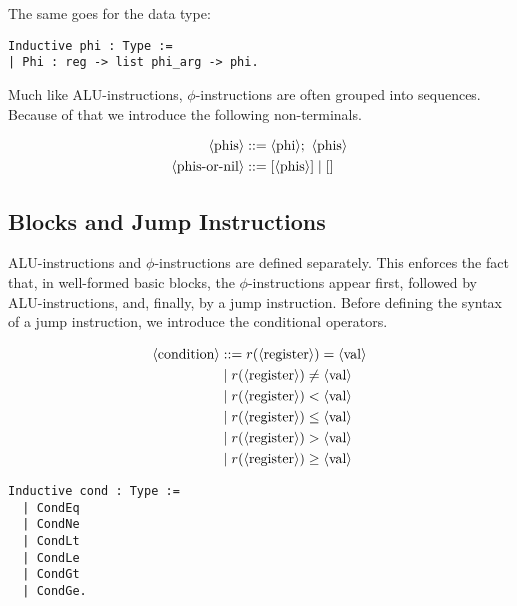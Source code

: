The same goes for the data type:

\begin{lstlisting}[style=Rocq]
Inductive phi : Type :=
| Phi : reg -> list phi_arg -> phi.
\end{lstlisting}

Much like ALU-instructions, $\phi$-instructions are often grouped into sequences. Because of that we introduce the following non-terminals.

\begin{align*}
\langle\text{phis}\rangle &::= \langle\text{phi}\rangle ; \ \langle\text{phis}\rangle \\
\langle\text{phis-or-nil}\rangle &::= [ \langle\text{phis}\rangle ] \mid []
\end{align*}


\subsection{Blocks and Jump Instructions}

ALU-instructions and $\phi$-instructions are defined separately. This enforces the fact that, in well-formed basic blocks, the $\phi$-instructions appear first, followed by ALU-instructions, and, finally, by a jump instruction.
Before defining the syntax of a jump instruction, we introduce the conditional operators.

\begin{minipage}{0.45\linewidth}
\begin{align*}
\langle\text{condition}\rangle &::= r(\langle\text{register}\rangle) = \langle\text{val}\rangle \\
&\mid r(\langle\text{register}\rangle) \neq \langle\text{val}\rangle \\
&\mid r(\langle\text{register}\rangle) < \langle\text{val}\rangle \\
&\mid r(\langle\text{register}\rangle) \leq \langle\text{val}\rangle \\
&\mid r(\langle\text{register}\rangle) > \langle\text{val}\rangle \\
&\mid r(\langle\text{register}\rangle) \geq \langle\text{val}\rangle \\
\end{align*}
\end{minipage}
\hfill
\begin{minipage}{0.45\linewidth}
\begin{lstlisting}[style=Rocq]
Inductive cond : Type :=
  | CondEq
  | CondNe
  | CondLt
  | CondLe
  | CondGt
  | CondGe.
\end{lstlisting}
\end{minipage}

